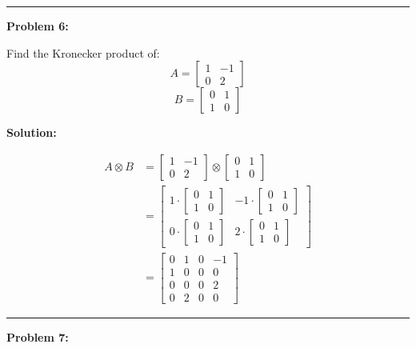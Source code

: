 \documentclass[
  letterpaper,
  DIV=11,
  numbers=noendperiod]{scrreprt}
\theoremstyle{plain}
\theoremstyle{definition}
\theoremstyle{remark}
\begin{document}
\begin{center}\rule{0.5\linewidth}{0.5pt}\end{center}

\textbf{Problem 6:}

Find the Kronecker product of:
\[A=\begin{bmatrix}1&-1\\0&2\end{bmatrix}\]
\[B=\begin{bmatrix}0&1\\1&0\end{bmatrix}\]

\textbf{Solution:}

\begin{align*}
A \otimes B &= \begin{bmatrix}1&-1\\0&2\end{bmatrix} \otimes \begin{bmatrix}0&1\\1&0\end{bmatrix} \\
&= \begin{bmatrix}
1 \cdot \begin{bmatrix}0&1\\1&0\end{bmatrix} & -1 \cdot \begin{bmatrix}0&1\\1&0\end{bmatrix} \\
0 \cdot \begin{bmatrix}0&1\\1&0\end{bmatrix} & 2 \cdot \begin{bmatrix}0&1\\1&0\end{bmatrix}
\end{bmatrix} \\
&= \begin{bmatrix}
0 & 1 & 0 & -1 \\
1 & 0 & 0 & 0 \\
0 & 0 & 0 & 2 \\
0 & 2 & 0 & 0
\end{bmatrix}
\end{align*}

\begin{center}\rule{0.5\linewidth}{0.5pt}\end{center}

\textbf{Problem 7:}
\end{document}
